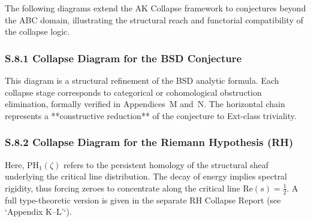 \documentclass[11pt]{article}
\DeclareMathOperator{\Sel}{Sel}
\newcommand{\Sha}{\mathcal{X}}
\begin{document}
The following diagrams extend the AK Collapse framework to conjectures beyond the ABC domain,  
illustrating the structural reach and functorial compatibility of the collapse logic.

\subsubsection*{S.8.1 Collapse Diagram for the BSD Conjecture}

\begin{center}
\end{center}


\noindent
This diagram is a structural refinement of the BSD analytic formula.  
Each collapse stage corresponds to categorical or cohomological obstruction elimination,  
formally verified in Appendices~M and~N.  
The horizontal chain represents a **constructive reduction** of the conjecture to Ext-class triviality.

\subsubsection*{S.8.2 Collapse Diagram for the Riemann Hypothesis (RH)}

\begin{center}
\end{center}

\noindent
Here, \( \mathrm{PH}_1(\zeta) \) refers to the persistent homology of the structural sheaf  
underlying the critical line distribution.  
The decay of energy implies spectral rigidity, thus forcing zeroes to concentrate along  
the critical line \( \mathrm{Re}(s) = \frac{1}{2} \).  
A full type-theoretic version is given in the separate RH Collapse Report (see `Appendix K–L'`).
\end{document}
